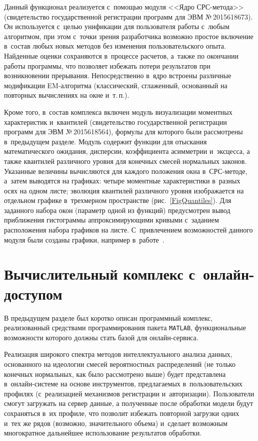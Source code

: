 \begin{multicols}{2}
Данный функционал реализуется с~по\-мощью модуля <<Ядро СРС-ме\-то\-да>>
(свидетельство государственной регистрации программ для ЭВМ
№\,2015618673). Он используется с~целью унификации для
пользователя работы с~любым алгоритмом, при этом с~точки зрения
разработчика возможно простое включение в~состав любых новых методов
без изменения пользовательского опыта. Найденные оценки сохраняются
в~процессе расчетов, а~так\-же по окончании работы программы, что
позволяет избежать потери результатов при возникновении прерывания.
Непосредственно в~ядро встроены различные модификации EM-ал\-го\-рит\-ма
(классический, сглаженный, основанный на повторных вычислениях на
окне и~т.\,п.).

Кроме того, в~состав комплекса включен модуль визуализации моментных
характеристик и~квантилей (свидетельство государственной регистрации
программ для ЭВМ №\,2015618564), формулы для которого были
рассмотрены в~предыдущем разделе. Модуль содержит функции для
отыскания математического ожидания, дисперсии, коэффициента
асимметрии и~эксцесса, а также квантилей различного уровня для
конечных смесей нормальных законов. Указанные величины вычисляются
для каждого положения окна в~СРС-ме\-то\-де, 
а~затем выводятся на графиках: четыре моментные характеристики 
в~разных осях на одном листе; эволюция квантилей различного уровня
изображается на отдельном графике в~трехмерном пространстве 
(рис.~\ref{FigQuantiles}). Для заданного набора окон (параметр одной
из функций) предусмотрен вывод приближения гистограммы
аппроксимирующими кривыми с~заданием расположения набора графиков на
лис\-те. С~привлечением возможностей данного модуля были созданы
графики, например в~работе~\cite{Gorshenin2015b}.

\vspace*{-6pt}

\section{Вычислительный комплекс с~онлайн-доступом}

В предыдущем разделе был коротко описан программный комплекс, 
реализованный средствами программирования пакета \verb"MATLAB", функциональные 
возможности которого должны стать базой для он\-лайн-сер\-виса.

Реализация широкого спектра методов интеллектуального анализа данных, основанного 
на идеологии смесей вероятностных распределений (не только конечных нормальных, 
как было рас\-смот\-ре\-но выше) будет представлена в~он\-лайн-сис\-те\-ме на основе 
инструментов, предлагаемых в~пользовательских профилях (с~реализацией  
механизмов регистрации и~авторизации). Пользователи смогут загружать 
на сервер данные, а полученные после обработки модели будут сохраняться 
в~их профиле, что позволит избежать повторной загрузки одних и~тех же рядов 
(возможно, значительного объема) и~сделает возможным многократное дальнейшее 
использование результатов обработки.


\end{multicols}
